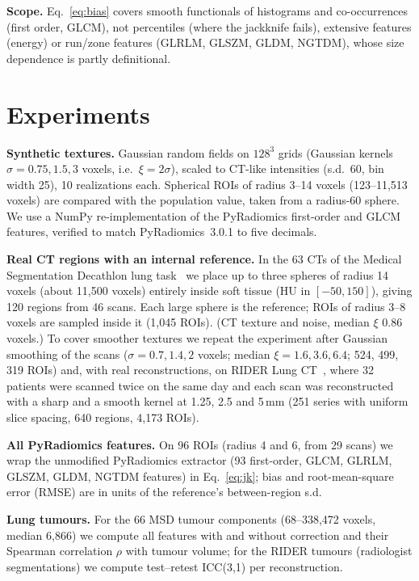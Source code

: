 \documentclass{article}
\begin{document}
\noindent\textbf{Scope.} Eq.~\eqref{eq:bias} covers smooth functionals of histograms and co-occurrences (first order, GLCM), not percentiles (where the jackknife fails), extensive features (energy) or run/zone features (GLRLM, GLSZM, GLDM, NGTDM), whose size dependence is partly definitional.

\section{Experiments}
\label{sec:exp}
\noindent\textbf{Synthetic textures.} Gaussian random fields on $128^3$ grids (Gaussian kernels $\sigma=0.75,1.5,3$ voxels, i.e.\ $\xi=2\sigma$), scaled to CT-like intensities (s.d.\ 60, bin width 25), 10 realizations each. Spherical ROIs of radius 3--14 voxels (123--11{,}513 voxels) are compared with the population value, taken from a radius-60 sphere. We use a NumPy re-implementation of the PyRadiomics first-order and GLCM features, verified to match PyRadiomics~3.0.1 to five decimals.

\noindent\textbf{Real CT regions with an internal reference.} In the 63 CTs of the Medical Segmentation Decathlon lung task~\cite{antonelli2022} we place up to three spheres of radius 14 voxels (about 11{,}500 voxels) entirely inside soft tissue (HU in $[-50,150]$), giving 120 regions from 46 scans. Each large sphere is the reference; ROIs of radius 3--8 voxels are sampled inside it (1{,}045 ROIs). (CT texture and noise, median $\xi$ 0.86 voxels.) To cover smoother textures we repeat the experiment after Gaussian smoothing of the scans ($\sigma=0.7,1.4,2$ voxels; median $\xi=1.6, 3.6, 6.4$; 524, 499, 319 ROIs) and, with real reconstructions, on RIDER Lung CT~\cite{zhao2024rider}, where 32 patients were scanned twice on the same day and each scan was reconstructed with a sharp and a smooth kernel at 1.25, 2.5 and 5\,mm (251 series with uniform slice spacing, 640 regions, 4{,}173 ROIs).

\noindent\textbf{All PyRadiomics features.} On 96 ROIs (radius 4 and 6, from 29 scans) we wrap the unmodified PyRadiomics extractor (93 first-order, GLCM, GLRLM, GLSZM, GLDM, NGTDM features) in Eq.~\eqref{eq:jk}; bias and root-mean-square error (RMSE) are in units of the reference's between-region s.d.

\noindent\textbf{Lung tumours.} For the 66 MSD tumour components (68--338{,}472 voxels, median 6{,}866) we compute all features with and without correction and their Spearman correlation $\rho$ with tumour volume; for the RIDER tumours (radiologist segmentations) we compute test--retest ICC(3,1) per reconstruction.
\end{document}
